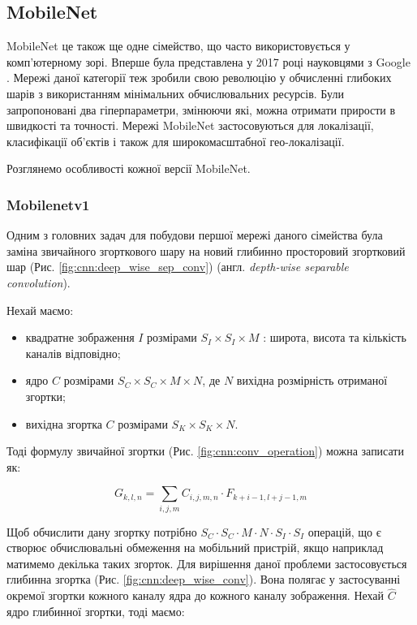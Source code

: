\subsection{MobileNet}

MobileNet це також ще одне сімейство, що часто використовується у комп'ютерному зорі.
Вперше була представлена у 2017 році науковцями з Google \cite{mobilenetv1}.
Мережі даної категорії теж зробили свою революцію у обчисленні глибоких шарів з
використанням мінімальних обчислювальних ресурсів. Були запропоновані два гіперпараметри,
змінюючи які, можна отримати прирости в швидкості та точності. Мережі MobileNet
застосовуються для локалізації, класифікації об'єктів і також для широкомасштабної
гео-локалізації.

Розглянемо особливості кожної версії MobileNet.

\subsubsection{Mobilenetv1}

Одним з головних задач для побудови першої мережі даного сімейства була заміна
звичайного згорткового шару на новий глибинно просторовий згортковий шар 
(Рис. \ref{fig:cnn:deep_wise_sep_conv}) (англ. \textit{depth-wise separable convolution}).

Нехай маємо:
\begin{itemize}
    \item квадратне зображення $I$ розмірами $S_I \times S_I \times M$ : широта, висота та
          кількість каналів відповідно;
    \item ядро $C$ розмірами $S_C \times S_C \times M \times N$, де $N$ вихідна розмірність
          отриманої згортки;
    \item вихідна згортка $C$ розмірами $S_K \times S_K \times N$.
\end{itemize}

Тоді формулу звичайної згортки (Рис. \ref{fig:cnn:conv_operation}) можна записати як:

\begin{equation}
    G_{k,l,n} = \sum_{i,j,m} C_{i,j,m,n} · F_{k+i-1, l+j-1,m}
    \label{eq:simple_conv}
\end{equation}

Щоб обчислити дану згортку потрібно $S_C · S_C · M · N · S_I · S_I$ операцій, що
є створює обчислювальні обмеження на мобільний пристрій, якщо наприклад матимемо
декілька таких згорток.
Для вирішення даної проблеми застосовується глибинна згортка (Рис. \ref{fig:cnn:deep_wise_conv}).
Вона полягає у застосуванні окремої згортки кожного каналу ядра до кожного каналу
зображення.
Нехай $\widehat{C}$ ядро глибинної згортки, тоді маємо:

